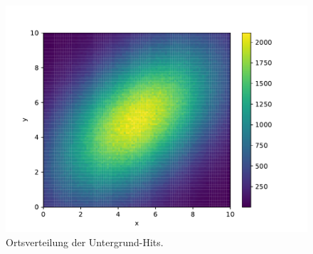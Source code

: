     \begin{figure}
        \centering
        \includegraphics[width=\textwidth]{unterort.pdf}
        \caption{Ortsverteilung der Untergrund-Hits.}
        \label{fig:unterort}
    \end{figure}
    \FloatBarrier